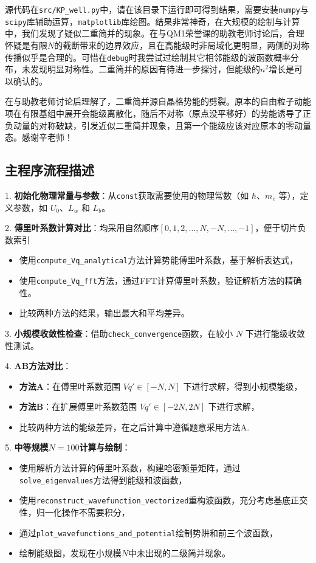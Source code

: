 源代码在\texttt{src/KP\_well.py}中，请在该目录下运行即可得到结果，需要安装\texttt{numpy}与\texttt{scipy}库辅助运算，\texttt{matplotlib}库绘图。结果非常神奇，在大规模的绘制与计算中，我们发现了疑似二重简并的现象。在与QM1荣誉课的助教老师讨论后，合理怀疑是有限$N$的截断带来的边界效应，且在高能级时非局域化更明显，两侧的对称传播似乎是合理的。可惜在\texttt{debug}时我尝试过绘制其它相邻能级的波函数概率分布，未发现明显对称性。二重简并的原因有待进一步探讨，但能级的$n^2$增长是可以确认的。

\noindent {}在与助教老师讨论后理解了，二重简并源自晶格势能的劈裂。原本的自由粒子动能项在有限基组中展开会能级离散化，随后不对称（原点没平移好）的势能诱导了正负动量的对称破缺，引发近似二重简并现象，且第一个能级应该对应原本的零动量态。感谢辛老师！

\subsection*{主程序流程描述}

1. \textbf{初始化物理常量与参数}：从\texttt{const}获取需要使用的物理常数（如 $\hbar$、$m_e$ 等），定义参数，如 $U_0$、$L_w$ 和 $L_b$。
   
2. \textbf{傅里叶系数计算对比}：均采用自然顺序$[0,1,2,\dots,N,-N,\dots,-1]$，便于切片负数索引
   \begin{itemize}
       \item 使用\texttt{compute\_Vq\_analytical}方法计算势能傅里叶系数，基于解析表达式，
       \item 使用\texttt{compute\_Vq\_fft}方法，通过FFT计算傅里叶系数，验证解析方法的精确性。
       \item 比较两种方法的结果，输出最大和平均差异。
   \end{itemize}
   
3. \textbf{小规模收敛性检查}：借助\texttt{check\_convergence}函数，在较小 $N$ 下进行能级收敛性测试。

4. \textbf{AB方法对比}：
   \begin{itemize}
       \item \textbf{方法A}：在傅里叶系数范围 $Vq' \in [-N, N]$ 下进行求解，得到小规模能级，
       \item \textbf{方法B}：在扩展傅里叶系数范围 $Vq' \in [-2N, 2N]$ 下进行求解，
       \item 比较两种方法的能级差异，在之后计算中遵循题意采用方法A.
   \end{itemize}

5. \textbf{中等规模$N=100$计算与绘制}：
   \begin{itemize}
       \item 使用解析方法计算的傅里叶系数，构建哈密顿量矩阵，通过\texttt{solve\_eigenvalues}方法得到能级和波函数，
       \item 使用\texttt{reconstruct\_wavefunction\_vectorized}重构波函数，充分考虑基底正交性，归一化操作不需要积分，
       \item 通过\texttt{plot\_wavefunctions\_and\_potential}绘制势阱和前三个波函数，
       \item 绘制能级图，发现在小规模$N$中未出现的二级简并现象。
   \end{itemize}

